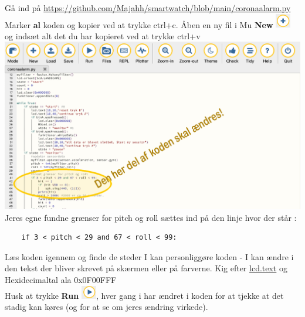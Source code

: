 \documentclass{ucph-handout}
\begin{document}
\newpage
\begin{exercisebox}[adjusted title=Kode til overvågning]

Gå ind på \url{https://github.com/Majahh/smartwatch/blob/main/coronaalarm.py}\\
Marker \textbf{al} koden og kopier ved at trykke ctrl+c. Åben en ny fil i Mu \textbf{New} \includegraphics[width=0.05\textwidth]{ikoner/new.png} og indsæt alt det du har kopieret ved at trykke ctrl+v\\

\includegraphics[width=1\textwidth]{billeder/and.jpg}\\

Jeres egne fundne grænser for pitch og roll sættes ind på den linje  hvor der står :
\begin{verbatim}
    if 3 < pitch < 29 and 67 < roll < 99:
\end{verbatim}

Læs koden igennem og finde de steder I kan personliggøre koden - I kan ændre i den tekst der bliver skrevet på skærmen eller på farverne. Kig efter \url{lcd.text} og Hexidecimaltal ala 0x0F00FFF\\ Husk at trykke \textbf{Run} \includegraphics[width=0.05\textwidth]{ikoner/run.png}, hver gang i har ændret i koden for at tjekke at det stadig kan køres (og for at se om jeres ændring virkede).



\end{exercisebox}
\end{document}
